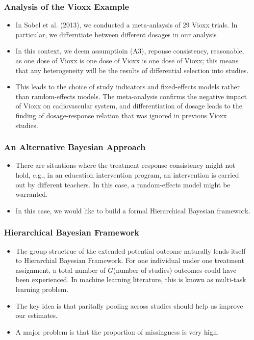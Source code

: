 \documentclass[xetex,mathserif,serif]{beamer}
\begin{document}
\begin{frame}
  \frametitle{Analysis of the Vioxx Example}
  \begin{itemize}
  \item In Sobel et al. (2013), we conducted a meta-anlaysis of 29 Vioxx
    trials. In particular, we differntiate between different dosages in our
    analysis
  \item In this context, we deem assumptioin (A3), reponse consistency,
    reasonable, as one dose of Vioxx is one dose of Vioxx is one dose of Vioxx;
    this means that any heterogeneity will be the results of differential
    selection into studies.
  \item This leads to the choice of study indicators and fixed-effects models
    rather than random-effects models. The meta-analysis confirms the negative
    impact of Vioxx on cadiovascular system, and differentiation of dosage leads
    to the finding of dosage-response relation that was ignored in previous
    Vioxx studies.
  \end{itemize}
\end{frame}
\begin{frame}
  \frametitle{An Alternative Bayesian Approach}
  \begin{itemize}
  \item There are situations where the treatment response consistency might not
    hold, e.g., in an education intervention program, an intervention is carried
    out by different teachers. In this case, a random-effects model might be
    warranted.
  \item In this case, we would like to build a formal Hierarchical Bayesian
    framework.
  \end{itemize}
\end{frame}

\begin{frame}
  \frametitle{Hierarchical Bayesian Framework}
  \begin{itemize}
  \item The group structrue of the extended potential outcome naturally lends
    itself to Hierarchial Bayesian Framework. For one individual under one
    treatment assignment, a total number of $G$(number of studies) outcomes could
    have been experienced. In machine learning literature, this is known as
    multi-task learning problem.
  \item The key idea is that paritally pooling across studies should help us
    improve our estimates.
  \item A major problem is that the proportion of missingness is very high.
  \end{itemize}
\end{frame}
\end{document}
